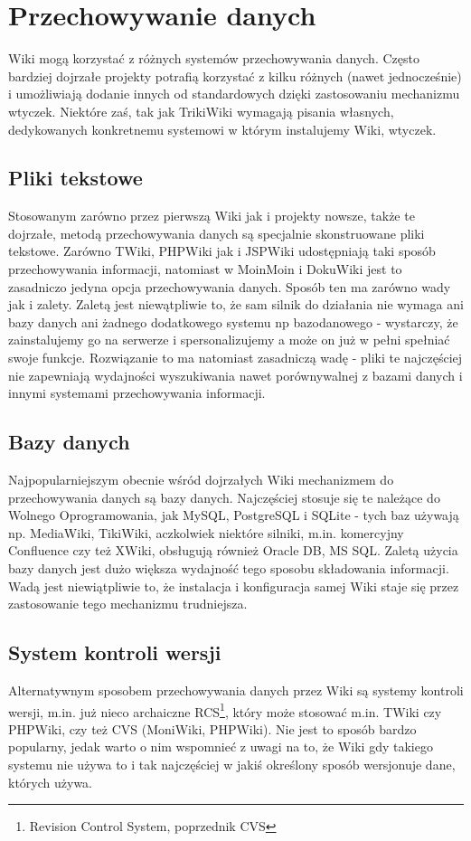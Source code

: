 \documentclass{article}
\begin{document}
\section{Przechowywanie danych}
	Wiki mogą korzystać z różnych systemów przechowywania danych. Często bardziej dojrzałe projekty potrafią korzystać z kilku różnych (nawet jednocześnie) i umożliwiają dodanie innych od standardowych dzięki zastosowaniu mechanizmu wtyczek. Niektóre zaś, tak jak TrikiWiki wymagają pisania własnych, dedykowanych konkretnemu systemowi w którym instalujemy Wiki, wtyczek. 
	\subsection{Pliki tekstowe}
	Stosowanym zarówno przez pierwszą Wiki jak i projekty nowsze, także te dojrzałe, metodą przechowywania danych są specjalnie skonstruowane pliki tekstowe. Zarówno TWiki, PHPWiki jak i JSPWiki udostępniają taki sposób przechowywania informacji, natomiast w MoinMoin i DokuWiki jest to zasadniczo jedyna opcja przechowywania danych. Sposób ten ma zarówno wady jak i zalety. Zaletą jest niewątpliwie to, że sam silnik do działania nie wymaga ani bazy danych ani żadnego dodatkowego systemu np bazodanowego - wystarczy, że zainstalujemy go na serwerze i spersonalizujemy a może on już w pełni spełniać swoje funkcje. Rozwiązanie to ma natomiast zasadniczą wadę - pliki te najczęściej nie zapewniają wydajności wyszukiwania nawet porównywalnej z bazami danych i innymi systemami przechowywania informacji. 
	\subsection{Bazy danych}
	Najpopularniejszym obecnie wśród dojrzałych Wiki mechanizmem do przechowywania danych są bazy danych. Najczęściej stosuje się te należące do Wolnego Oprogramowania, jak MySQL, PostgreSQL i SQLite - tych baz używają np. MediaWiki, TikiWiki, aczkolwiek niektóre silniki, m.in. komercyjny Confluence czy też XWiki, obsługują również Oracle DB, MS SQL. Zaletą użycia bazy danych jest dużo większa wydajność tego sposobu składowania informacji. Wadą jest niewiątpliwie to, że instalacja i konfiguracja samej Wiki staje się przez zastosowanie tego mechanizmu trudniejsza.
	\subsection{System kontroli wersji}
	Alternatywnym sposobem przechowywania danych przez Wiki są systemy kontroli wersji, m.in. już nieco archaiczne RCS\footnote{Revision Control System, poprzednik CVS}, który może stosować m.in. TWiki czy PHPWiki, czy też CVS (MoniWiki, PHPWiki). Nie jest to sposób bardzo popularny, jedak warto o nim wspomnieć z uwagi na to, że Wiki gdy takiego systemu nie używa to i tak najczęściej w jakiś określony sposób wersjonuje dane, których używa.
\newpage
\end{document}
